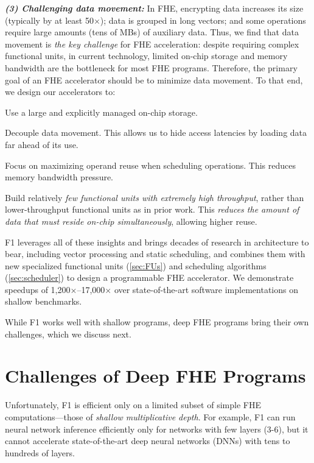 \noindent \textbf{\emph{(3) Challenging data movement:}}
In FHE, encrypting data increases its size (typically by at least 50$\times$);
data is grouped in long vectors; and some operations require large amounts
(tens of MBs) of auxiliary data. Thus, we find that data movement is \emph{the
key challenge} for FHE acceleration: despite requiring complex functional
units, in current technology, limited on-chip storage and memory bandwidth are
the bottleneck for most FHE programs. Therefore, the primary goal of an FHE
accelerator should be to
minimize data movement. To that end, we design our accelerators to:
\begin{compactenum}
\item Use a large and explicitly managed on-chip storage.
\item Decouple data movement. This allows us to hide access latencies by
    loading data far ahead of its use.
\item Focus on maximizing operand reuse when scheduling operations. This reduces
    memory bandwidth pressure.
\item Build relatively \emph{few functional units with extremely high
    throughput}, rather than lower-throughput functional units as in prior
    work. This \emph{reduces the amount of data that must reside on-chip
    simultaneously}, allowing higher reuse.
\end{compactenum}

F1 leverages all of these insights and brings decades of research in
architecture to bear, including vector processing and static scheduling, and
combines them with new specialized functional units (\autoref{sec:FUs}) and
scheduling algorithms (\autoref{sec:scheduler}) to design a programmable FHE
accelerator. We demonstrate speedups of 1,200$\times$--17,000$\times$ over
state-of-the-art software implementations on shallow benchmarks.

While F1 works well with shallow programs, deep FHE programs bring their own
challenges, which we discuss next.

\section{Challenges of Deep FHE Programs}

Unfortunately, F1 is efficient only on a limited subset of simple FHE
computations---those of \emph{shallow multiplicative depth}. For example, F1
can run neural network inference efficiently only for networks with few layers
(3-6), but it cannot accelerate state-of-the-art deep neural networks (DNNs)
with tens to hundreds of layers.

